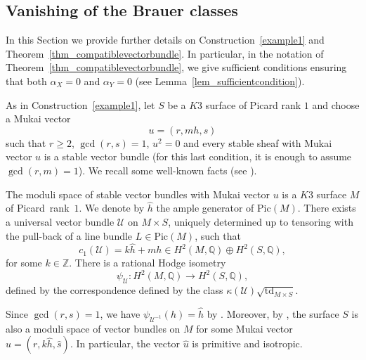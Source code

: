 \documentclass[12pt,a4paper]{amsart}
\theoremstyle{plain}
\theoremstyle{definition}
\theoremstyle{remark}
\def\td{\operatorname{td}}
\def\Pic{\mathrm{Pic}}
\def\Z{\mathbb{Z}}
\def\QQ{\mathbb{Q}}
\def\U{\mathcal{U}}
\newcommand{\rathodge}[1]{\psi_{#1}}
\begin{document}
\subsection{Vanishing of the Brauer classes}\label{sec_vanishing_twist}
In this Section we provide further details on Construction~\ref{example1} and Theorem~\ref{thm_compatiblevectorbundle}. In particular, in the notation of Theorem~\ref{thm_compatiblevectorbundle}, we give sufficient conditions ensuring that both $\alpha_X=0$ and $\alpha_Y=0$ (see Lemma~\ref{lem_sufficientcondition}).

As in Construction~\ref{example1}, let $S$ be a $K3$ surface of Picard rank $1$ and choose a Mukai vector
\begin{equation}
    u=(r,mh,s)
\end{equation}
such that $r\geq 2$, $\gcd(r,s)=1$, $u^2=0$ and every stable sheaf with Mukai vector $u$ is a stable vector bundle (for this last condition, it is enough to assume $\gcd(r,m)=1$). We recall some well-known facts (see \cite{Mukai2,Yoshioka}).

The moduli space of stable vector bundles with Mukai vector $u$ is a $K3$ surface $M$ of Picard~rank~$1$. We denote by $\hat{h}$ the ample generator of $\Pic(M)$. There exists a universal vector bundle $\mathcal{U}$ on $M\times S$, uniquely determined up to tensoring with the pull-back of a line bundle $L\in \Pic(M)$, such that
\begin{equation}\label{id_c1U}
    c_1(\mathcal{U})=k\hat{h}+mh \in H^2(M,\QQ)\oplus H^2(S,\mathbb{Q}),
\end{equation} for some $k\in \Z$.
There is a rational Hodge isometry
\[
    \rathodge{\U}\colon H^2(M,\QQ)\rightarrow H^2(S,\QQ),
\]
defined by the correspondence defined by the class $\kappa(\U)\sqrt{\td_{M\times S}}$.

Since $\gcd(r,s)=1$, we have $\rathodge{\U^{-1}}(h)=\widehat{h}$ by \cite[Appendix, Example 1]{Yoshioka}.
Moreover, by \cite[Theorem 2.2]{Yoshioka}, the surface $S$ is also a moduli space of vector bundles on $M$ for some Mukai vector $\widehat{u}=(r,k\widehat{h},\widehat{s})$. In particular, the vector $\widehat{u}$ is primitive and isotropic.
\end{document}
